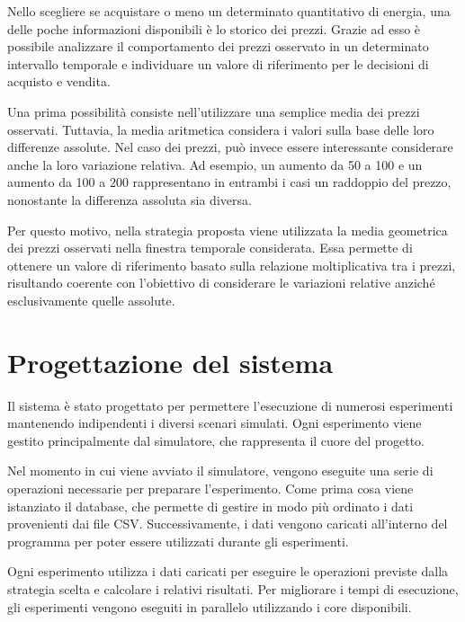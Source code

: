\documentclass[a4paper,oneside,italian]{sapthesis}
\begin{document}
Nello scegliere se acquistare o meno un determinato quantitativo di energia,
una delle poche informazioni disponibili è lo storico dei prezzi. Grazie ad
esso è possibile analizzare il comportamento dei prezzi osservato in un
determinato intervallo temporale e individuare un valore di riferimento per
le decisioni di acquisto e vendita.

Una prima possibilità consiste nell'utilizzare una semplice media dei prezzi
osservati. Tuttavia, la media aritmetica considera i valori sulla base delle
loro differenze assolute. Nel caso dei prezzi, può invece essere interessante
considerare anche la loro variazione relativa. Ad esempio, un aumento da
50 a 100 e un aumento da 100 a 200 rappresentano in entrambi i casi un
raddoppio del prezzo, nonostante la differenza assoluta sia diversa.

Per questo motivo, nella strategia proposta viene utilizzata la media
geometrica dei prezzi osservati nella finestra temporale considerata. Essa
permette di ottenere un valore di riferimento basato sulla relazione
moltiplicativa tra i prezzi, risultando coerente con l'obiettivo di considerare
le variazioni relative anziché esclusivamente quelle assolute.



\section{Progettazione del sistema}

Il sistema è stato progettato per permettere l'esecuzione di numerosi
esperimenti mantenendo indipendenti i diversi scenari simulati. Ogni
esperimento viene gestito principalmente dal simulatore, che rappresenta
il cuore del progetto.

Nel momento in cui viene avviato il simulatore, vengono eseguite una serie
di operazioni necessarie per preparare l'esperimento. Come prima cosa viene
istanziato il database, che permette di gestire in modo più ordinato i dati
provenienti dai file CSV. Successivamente, i dati vengono caricati all'interno
del programma per poter essere utilizzati durante gli esperimenti.

Ogni esperimento utilizza i dati caricati per eseguire le operazioni previste
dalla strategia scelta e calcolare i relativi risultati. Per migliorare i tempi
di esecuzione, gli esperimenti vengono eseguiti in parallelo utilizzando i
core disponibili.
\end{document}
